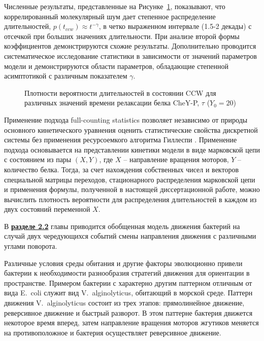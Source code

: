 Численные результаты, представленные на Рисунке~\cref{fig:duration-pdf}, показывают, что коррелированный молекулярный шум дает степенное распределение длительностей, $p(t_{ccw}) \approx t^{-\gamma}$, в четко выраженном интервале (1.5-2 декады) с отсечкой при больших значениях длительности. При анализе второй формы коэффициентов демонстрируются схожие результаты. Дополнительно проводится систематическое исследование статистики в зависимости от значений параметров модели и демонстрируются области параметров, обладающие степенной асимптотикой с различным показателем $\gamma$.

\begin{figure}[ht]
    \caption{
        Плотности вероятности длительностей в состоянии CCW для различных значений времени релаксации белка CheY-P, $\tau$ ($Y_0=20$)
    }
    \label{fig:duration-pdf}
\end{figure}

Применение подхода full-counting statistics позволяет независимо от природы основного кинетического уравнения оценить статистические свойства дискретной системы без применения ресурсоемкого алгоритма Гиллеспи \cite{gillespie_stochastic_2007}. Применение подхода основывается на представлении кинетики модели в виде марковской цепи с состоянием из пары $(X,Y)$, где $X$ -- направление вращения моторов, $Y$ -- количество белка. Тогда, за счет нахождения собственных чисел и векторов специальной матрицы переходов, стационарного распределения марковской цепи и применения формулы, полученной в настоящей диссертационной работе, можно вычислить плотность вероятности для распределения длительностей в каждом из двух состояний переменной $X$. 

В \underline{\textbf{разделе 2.2}} главы приводится обобщенная модель движения бактерий на случай двух чередующихся событий смены направления движения с различными углами поворота. 

Различные условия среды обитания и другие факторы эволюционно привели бактерии к необходимости разнообразия стратегий движения для ориентации в пространстве. Примером бактерии с характерно другим паттерном отличным от вида E.~coli служит вид V.~alginolyticus, обитающий в морской среде. Паттерн движения V.~alginolyticus состоит из трех этапов: прямолинейное движение, реверсивное движение и быстрый разворот. В этом паттерне бактерия движется некоторое время вперед, затем направление вращения моторов жгутиков меняется на противоположное и бактерия осуществляет реверсивное движение. 

